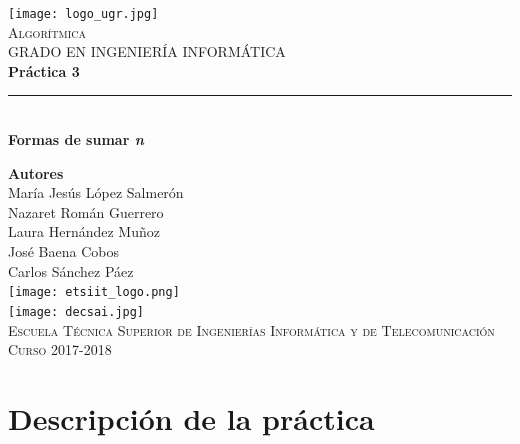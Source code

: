 \documentclass[12pt,spanish]{article}
\begin{document}
\begin{titlepage}

\newlength{\centeroffset}
\setlength{\centeroffset}{-0.5\oddsidemargin}
\addtolength{\centeroffset}{0.5\evensidemargin}
\thispagestyle{empty}

\noindent\hspace*{\centeroffset}
\begin{minipage}{\textwidth}

\centering
\texttt{[image: logo\_ugr.jpg]}\\[1.4cm]

\textsc{ \Large Algorítmica\\[0.2cm]}
\textsc{GRADO EN INGENIERÍA INFORMÁTICA}\\[1cm]

{\Huge\bfseries Práctica 3\\}
\noindent\rule[-1ex]{\textwidth}{3pt}\\[3.5ex]
{\large\bfseries Formas de sumar \emph{n}}
\end{minipage}

\vspace{1.5cm}
\noindent\hspace*{\centeroffset}
\begin{minipage}{\textwidth}
\centering

\textbf{Autores}\\ {María Jesús López Salmerón \\ Nazaret Román Guerrero \\ Laura Hernández Muñoz \\ José Baena Cobos  \\ Carlos Sánchez Páez}\\[2.5ex]
\texttt{[image: etsiit\_logo.png]}\\[0.1cm]
\vspace{1.5cm}
\texttt{[image: decsai.jpg]}\\[0.1cm]
\vspace{1cm}
\textsc{Escuela Técnica Superior de Ingenierías Informática y de Telecomunicación}\\
\vspace{1cm}
\textsc{Curso 2017-2018}
\end{minipage}
\end{titlepage}
\tableofcontents
\thispagestyle{empty}
\listoffigures
\newpage
\setcounter{page}{1}
\section{Descripción de la práctica}
\end{document}
